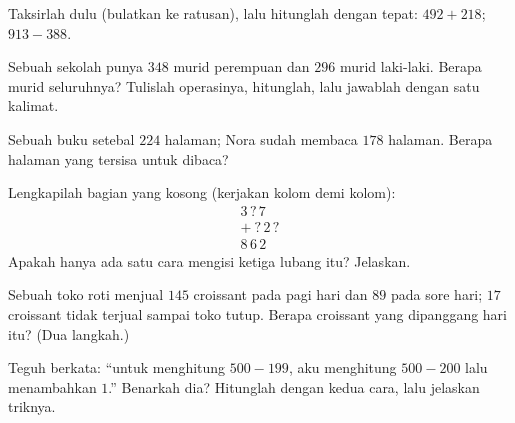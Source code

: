 \begin{exercise}[$\star$]\label{exo:g3:addsub:6}
Taksirlah dulu (bulatkan ke ratusan), lalu hitunglah dengan tepat:
$492 + 218$; \quad $913 - 388$.
\end{exercise}

\begin{exercise}[$\star$]\label{exo:g3:addsub:7}
Sebuah sekolah punya $348$ murid perempuan dan $296$ murid laki-laki.
Berapa murid seluruhnya? Tulislah operasinya, hitunglah, lalu jawablah dengan satu kalimat.
\end{exercise}

\begin{exercise}[$\star$]\label{exo:g3:addsub:8}
Sebuah buku setebal $224$ halaman; Nora sudah membaca $178$ halaman.
Berapa halaman yang tersisa untuk dibaca?
\end{exercise}

\begin{exercise}[$\star$]\label{exo:g3:addsub:9}
Lengkapilah bagian yang kosong (kerjakan kolom demi kolom):
\[
\begin{array}{r}
3\,?\,7 \\
+\ ?\,2\,? \\
\hline
8\,6\,2
\end{array}
\]
Apakah hanya ada satu cara mengisi ketiga lubang itu? Jelaskan.
\end{exercise}

\begin{exercise}[$\star\star$]\label{exo:g3:addsub:10}
Sebuah toko roti menjual $145$ croissant pada pagi hari dan $89$
pada sore hari; $17$ croissant tidak terjual sampai toko tutup.
Berapa croissant yang dipanggang hari itu? (Dua langkah.)
\end{exercise}

\begin{exercise}[$\star\star$]\label{exo:g3:addsub:11}
Teguh berkata: ``untuk menghitung $500 - 199$, aku menghitung
$500 - 200$ lalu menambahkan $1$.'' Benarkah dia? Hitunglah dengan kedua cara, lalu jelaskan triknya.

\end{exercise}
